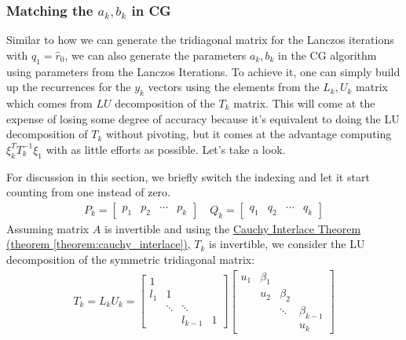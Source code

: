 \documentclass[]{article}
\theoremstyle{definition}
\begin{document}
        \subsubsection{Matching the $a_k, b_k$ in CG}
            Similar to how we can generate the tridiagonal matrix for the Lanczos iterations with $q_1 = \hat{r}_0$, we can also generate the parameters $a_k, b_k$ in the CG algorithm using parameters from the Lanczos Iterations. To achieve it, one can simply build up the recurrences for the $y_k$ vectors using the elements from the $L_k, U_k$ matrix which comes from $LU$ decomposition of the $T_k$ matrix. This will come at the expense of losing some degree of accuracy because it's equivalent to doing the LU decomposition of $T_k$ without pivoting, but it comes at the advantage computing $\xi_k^TT_k^{-1}\xi_1$  with as little efforts as possible. Let's take a look. 
            \par
            For discussion in this section, we briefly switch the indexing and let it start counting from one instead of zero. 
            \begin{align}
                P_k = \begin{bmatrix}
                    p_1 & p_2& \cdots & p_k
                \end{bmatrix} \quad
                Q_k = \begin{bmatrix}
                    q_1 & q_2 & \cdots & q_k
                \end{bmatrix}
            \end{align}
            Assuming matrix $A$ is invertible and using the \hyperref[theorem:cauchy_interlace]{Cauchy Interlace Theorem (theorem \ref*{theorem:cauchy_interlace})}, $T_k$ is invertible, we consider the LU decomposition of the symmetric tridiagonal matrix: 
            \begin{align}
                T_k = L_k U_k =
                \begin{bmatrix}
                    1 & & & \\
                    l_1 & 1 & & \\
                    & \ddots& \ddots & 
                    \\
                    & & l_{k - 1} & 1
                \end{bmatrix}\begin{bmatrix}
                    u_1& \beta_1 & & \\
                    & u_2 &\beta_2 & \\
                    & &\ddots & \beta_{k - 1}\\
                    & & & u_k
                \end{bmatrix}
            \end{align}
\end{document}
